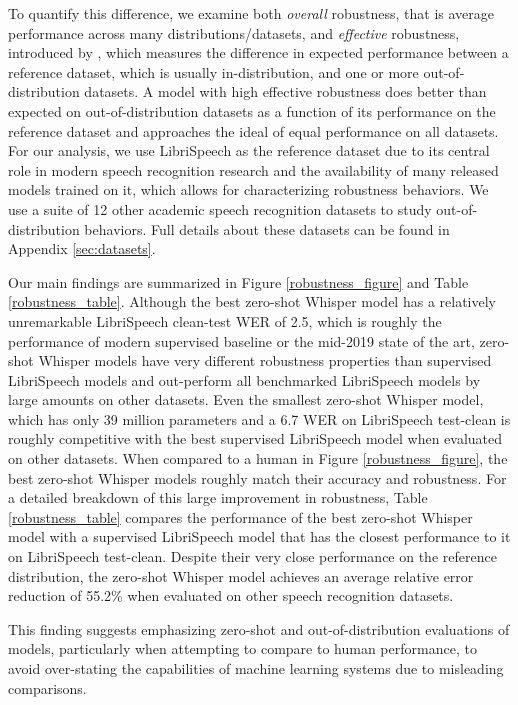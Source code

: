To quantify this difference, we examine both \textit{overall} robustness, that is average performance across many distributions/datasets, and \textit{effective} robustness, introduced by \citet{taori2020robustness}, which measures the difference in expected performance between a reference dataset, which is usually in-distribution, and one or more out-of-distribution datasets. A model with high effective robustness does better than expected on out-of-distribution datasets as a function of its performance on the reference dataset and approaches the ideal of equal performance on all datasets. For our analysis, we use LibriSpeech as the reference dataset due to its central role in modern speech recognition research and the availability of many released models trained on it, which allows for characterizing robustness behaviors. We use a suite of 12 other academic speech recognition datasets to study out-of-distribution behaviors. Full details about these datasets can be found in Appendix \ref{sec:datasets}.

Our main findings are summarized in Figure \ref{robustness_figure} and Table \ref{robustness_table}. Although the best zero-shot Whisper model has a relatively unremarkable LibriSpeech clean-test WER of 2.5, which is roughly the performance of modern supervised baseline or the mid-2019 state of the art, zero-shot Whisper models have very different robustness properties than supervised LibriSpeech models and out-perform all benchmarked LibriSpeech models by large amounts on other datasets. Even the smallest zero-shot Whisper model, which has only 39 million parameters and a 6.7 WER on LibriSpeech test-clean is roughly competitive with the best supervised LibriSpeech model when evaluated on other datasets. When compared to a human in Figure \ref{robustness_figure}, the best zero-shot Whisper models roughly match their accuracy and robustness. For a detailed breakdown of this large improvement in robustness, Table \ref{robustness_table} compares the performance of the best zero-shot Whisper model with a supervised LibriSpeech model that has the closest performance to it on LibriSpeech test-clean. Despite their very close performance on the reference distribution, the zero-shot Whisper model achieves an average relative error reduction of 55.2\% when evaluated on other speech recognition datasets. 

This finding suggests emphasizing zero-shot and out-of-distribution evaluations of models, particularly when attempting to compare to human performance, to avoid over-stating the capabilities of machine learning systems due to misleading comparisons.

